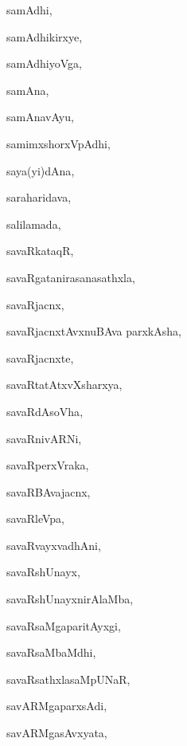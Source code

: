 \begin{multicols}{3}
{\noindent
{samAdhi}, \pageref{samAdhi}

\noindent
{samAdhikirxye}, \pageref{samAdhikirxye}

\noindent
{samAdhiyoVga}, \pageref{samAdhiyoVga}

\noindent
{samAna}, \pageref{samAna}

\noindent
{samAnavAyu}, \pageref{samAnavAyu}

\noindent
{samimxshorxVpAdhi}, \pageref{samimxshorxVpAdhi}

\noindent
{saya(yi)dAna}, \pageref{sayayidAna}

\noindent
{saraharidava}, \pageref{saraharidava}

\noindent
{salilamada}, \pageref{salilamada}

\noindent
{savaRkataqR}, \pageref{savaRkataqR}

\noindent
{savaRgatanirasanasathxla}, \pageref{savaRgatanirasanasathxla}

\noindent
{savaRjacnx}, \pageref{savaRjacnx}

\noindent
{savaRjacnxtAvxnuBAva parxkAsha}, \pageref{savaRjacnxtAvxnuBAvaparxkAsha}

\noindent
{savaRjacnxte}, \pageref{savaRjacnxte}

\noindent
{savaRtatAtxvXsharxya}, \pageref{savaRtatAtxvXsharxya}

\noindent
{savaRdAsoVha}, \pageref{savaRdAsoVha}

\noindent
{savaRnivARNi}, \pageref{savaRnivARNi}

\noindent
{savaRperxVraka}, \pageref{savaRperxVraka}

\noindent
{savaRBAvajacnx}, \pageref{savaRBAvajacnx}

\noindent
{savaRleVpa}, \pageref{savaRleVpa}

\noindent
{savaRvayxvadhAni}, \pageref{savaRvayxvadhAni}

\noindent
{savaRshUnayx}, \pageref{savaRshUnayx}

\noindent
{savaRshUnayxnirAlaMba}, \pageref{savaRshUnayxnirAlaMba}

\noindent
{savaRsaMgaparitAyxgi}, \pageref{savaRsaMgaparitAyxgi}

\noindent
{savaRsaMbaMdhi}, \pageref{savaRsaMbaMdhi}

\noindent
{savaRsathxlasaMpUNaR}, \pageref{savaRsathxlasaMpUNaR}

\noindent
{savARMgaparxsAdi}, \pageref{savARMgaparxsAdi}

\noindent
{savARMgasAvxyata}, \pageref{savARMgasAvxyata}

}
\end{multicols}
